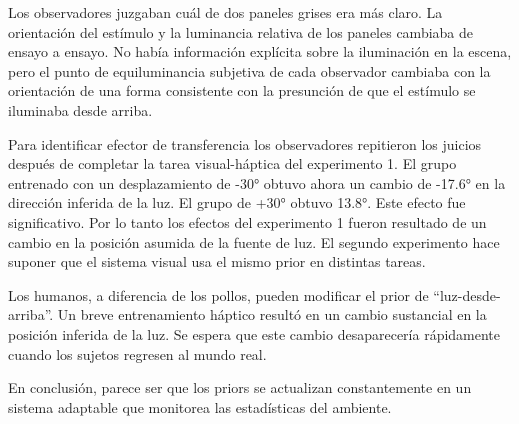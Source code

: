 \documentclass[a4paper,12pt]{article}
\begin{document}
Los observadores juzgaban cuál de dos paneles grises era más claro. La orientación del estímulo y la luminancia relativa de los paneles cambiaba de ensayo a ensayo. No había información explícita sobre la iluminación en la escena, pero el punto de equiluminancia subjetiva de cada observador cambiaba con la orientación de una forma consistente con la presunción de que el estímulo se iluminaba desde arriba.

Para identificar efector de transferencia los observadores repitieron los juicios después de completar la tarea visual-háptica del experimento 1. El grupo entrenado con un desplazamiento de -30° obtuvo ahora un cambio de -17.6° en la dirección inferida de la luz. El grupo de +30° obtuvo 13.8°. Este efecto fue significativo. Por lo tanto los efectos del experimento 1 fueron resultado de un cambio en la posición asumida de la fuente de luz. El segundo experimento hace suponer que el sistema visual usa el mismo prior en distintas tareas.

Los humanos, a diferencia de los pollos, pueden modificar el prior de ``luz-desde-arriba''. Un breve entrenamiento háptico resultó en un cambio sustancial en la posición inferida de la luz. Se espera que este cambio desaparecería rápidamente cuando los sujetos regresen al mundo real.

En conclusión, parece ser que los priors se actualizan constantemente en un sistema adaptable que monitorea las estadísticas del ambiente.
\end{document}
